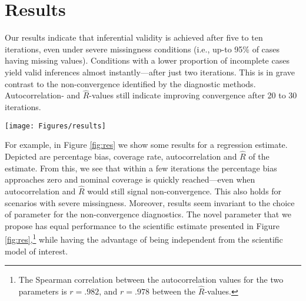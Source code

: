 \documentclass{article}
\begin{document}
\section{Results}
\label{results}

Our results indicate that inferential validity is achieved after five to ten iterations, even under severe missingness conditions (i.e., up-to 95\% of cases having missing values). Conditions with a lower proportion of incomplete cases yield valid inferences almost instantly---after just two iterations. This is in grave contrast to the non-convergence identified by the diagnostic methods. Autocorrelation- and $\widehat{R}$-values still indicate improving convergence after 20 to 30 iterations. 


\begin{figure*}
{\centering \texttt{[image: Figures/results]} 
}
\caption{Subset of simulation results (truncated at 50 iterations). Depicted are performance measures percentage bias and coverage rate, and non-convergence identifiers autocorrelation and $\widehat{R}$ for a regression estimate. The solid gray lines represent inferential validity of the estimate (i.e., unbiasedness and nominal coverage), whereas the dashed gray lines depict common diagnostic thresholds of the identifiers.}\label{fig:res}
\end{figure*}

For example, in Figure \ref{fig:res} we show some results for a regression estimate. Depicted are percentage bias, coverage rate,  autocorrelation and $\widehat{R}$ of the estimate. From this, we see that within a few iterations the percentage bias approaches zero and nominal coverage is quickly reached---even when autocorrelation and $\widehat{R}$ would still signal non-convergence. This also holds for scenarios with severe missingness. Moreover, results seem invariant to the choice of parameter for the non-convergence diagnostics. The novel parameter that we propose has equal performance to the scientific estimate presented in Figure \ref{fig:res},\footnote{The Spearman correlation between the autocorrelation values for the two parameters is $r=.982$, and $r=.978$ between the $\widehat{R}$-values.} while having the advantage of being independent from the scientific model of interest. 

% 
\end{document}
